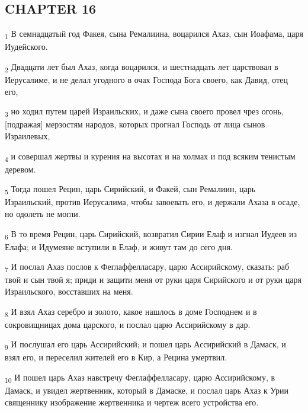 \subsection{CHAPTER 16}
\begin{tcolorbox}
\textsubscript{1} В семнадцатый год Факея, сына Ремалиина, воцарился Ахаз, сын Иоафама, царя Иудейского.
\end{tcolorbox}
\begin{tcolorbox}
\textsubscript{2} Двадцати лет был Ахаз, когда воцарился, и шестнадцать лет царствовал в Иерусалиме, и не делал угодного в очах Господа Бога своего, как Давид, отец его,
\end{tcolorbox}
\begin{tcolorbox}
\textsubscript{3} но ходил путем царей Израильских, и даже сына своего провел чрез огонь, [подражая] мерзостям народов, которых прогнал Господь от лица сынов Израилевых,
\end{tcolorbox}
\begin{tcolorbox}
\textsubscript{4} и совершал жертвы и курения на высотах и на холмах и под всяким тенистым деревом.
\end{tcolorbox}
\begin{tcolorbox}
\textsubscript{5} Тогда пошел Рецин, царь Сирийский, и Факей, сын Ремалиин, царь Израильский, против Иерусалима, чтобы завоевать его, и держали Ахаза в осаде, но одолеть не могли.
\end{tcolorbox}
\begin{tcolorbox}
\textsubscript{6} В то время Рецин, царь Сирийский, возвратил Сирии Елаф и изгнал Иудеев из Елафа; и Идумеяне вступили в Елаф, и живут там до сего дня.
\end{tcolorbox}
\begin{tcolorbox}
\textsubscript{7} И послал Ахаз послов к Феглаффелласару, царю Ассирийскому, сказать: раб твой и сын твой я; приди и защити меня от руки царя Сирийского и от руки царя Израильского, восставших на меня.
\end{tcolorbox}
\begin{tcolorbox}
\textsubscript{8} И взял Ахаз серебро и золото, какое нашлось в доме Господнем и в сокровищницах дома царского, и послал царю Ассирийскому в дар.
\end{tcolorbox}
\begin{tcolorbox}
\textsubscript{9} И послушал его царь Ассирийский; и пошел царь Ассирийский в Дамаск, и взял его, и переселил жителей его в Кир, а Рецина умертвил.
\end{tcolorbox}
\begin{tcolorbox}
\textsubscript{10} И пошел царь Ахаз навстречу Феглаффелласару, царю Ассирийскому, в Дамаск, и увидел жертвенник, который в Дамаске, и послал царь Ахаз к Урии священнику изображение жертвенника и чертеж всего устройства его.
\end{tcolorbox}
